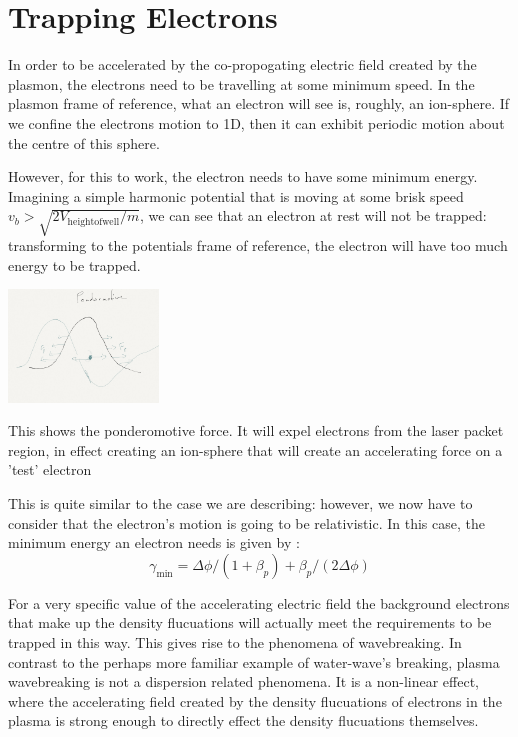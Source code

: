\documentclass[12pt, titlepage]{caesar_book}
\begin{document}
\section{Trapping Electrons}
In order to be accelerated by the co-propogating electric field created by the plasmon, the electrons need to be travelling at some minimum speed. In the plasmon frame of reference, what an electron will see is, roughly, an ion-sphere. If we confine the electrons motion to 1D, then it can exhibit periodic motion about the centre of this sphere. 

However, for this to work, the electron needs to have some minimum energy. Imagining a simple harmonic potential that is moving at some brisk speed $v_b > \sqrt{2 V_\mathrm{height of well}/m} $, we can see that an electron at rest will not be trapped: transforming to the potentials frame of reference, the electron will have too much energy to be trapped.
\begin{marginfigure}
\includegraphics[width=4cm]{./pf.png}
\caption{This shows the ponderomotive force. It will expel electrons from the laser
packet region, in effect creating an ion-sphere that will create an accelerating force
on a 'test' electron}
\end{marginfigure}
This is quite similar to the case we are describing: however, we now have to consider that the electron's motion is going to be relativistic. In this case, the minimum energy an electron needs is given by :
\begin{equation}
\gamma_\mathrm{min} = \Delta \phi / (1+\beta_p) + \beta_p/(2 \Delta \phi)
\end{equation}


For a very specific value of the accelerating electric field the background electrons that make up the density flucuations will actually meet the requirements to be trapped in this way. This gives rise to the phenomena of wavebreaking. In contrast to the perhaps more familiar example of water-wave's breaking, plasma wavebreaking is not a dispersion related phenomena. It is a non-linear effect, where the accelerating field created by the density flucuations of electrons in the plasma is strong enough to directly effect the density flucuations themselves.
\end{document}
